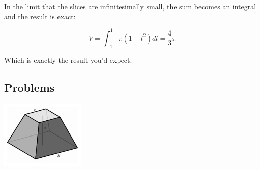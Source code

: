 \documentclass[12pt]{book}
\begin{document}
 \noindent In the limit that the slices are infinitesimally small, the sum becomes an integral and the result is exact:

\begin{equation*}
 V = \int_{-1}^1 \pi(1-l^2) dl = \frac{4}{3}\pi
\end{equation*}

 \noindent Which is exactly the result you'd expect.



\subsection{Problems}

\begin{center}
\includegraphics[width=0.3\textwidth]{figure12.jpg}
\end{center}
\end{document}
